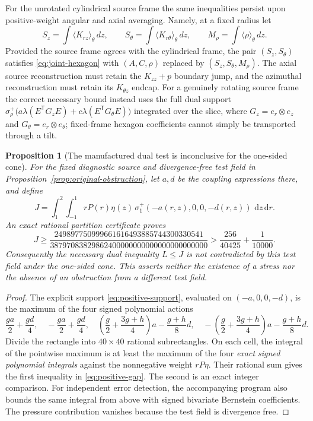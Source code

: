 \documentclass[11pt,a4paper]{article}
\theoremstyle{plain}
\newtheorem{proposition}[theorem]{Proposition}
\theoremstyle{definition}
\newcommand{\dd}{\,\mathrm{d}}
\begin{document}
For the unrotated cylindrical source frame the same inequalities
persist upon positive-weight angular and axial averaging. Namely,
at a fixed radius let
\[
 S_z=\int\!\langle K_{rz}\rangle_\theta\,dz,\qquad
 S_\theta=\int\!\langle K_{r\theta}\rangle_\theta\,dz,\qquad
 M_\rho=\int\!\langle\rho\rangle_\theta\,dz.
\]
Provided the source frame agrees with the cylindrical frame, the
pair $(S_z,S_\theta)$ satisfies \eqref{eq:joint-hexagon} with
$(A,C,\rho)$ replaced by $(S_z,S_\theta,M_\rho)$.
The axial source reconstruction must retain the $K_{zz}+p$ boundary
jump, and the azimuthal reconstruction must retain its $K_{\theta z}$
endcap. For a genuinely rotating source frame the correct necessary
bound instead uses the full dual support
$\sigma^+_\rho\bigl(a\lambda(E^{\mathsf T}G_zE)
+c\lambda(E^{\mathsf T}G_\theta E)\bigr)$ integrated over the
slice, where $G_z=e_r\otimes e_z$ and
$G_\theta=e_r\otimes e_\theta$; fixed-frame hexagon coefficients
cannot simply be transported through a tilt.

\begin{proposition}[The manufactured dual test is inconclusive for
the one-sided cone]\label{prop:positive-diagnostic}
For the fixed diagnostic source and divergence-free test field in
Proposition~\ref{prop:original-obstruction}, let $a,d$ be the
coupling expressions there, and define
\[
 J=\int_1^2\!\int_{-1}^1
 rP(r)\eta(z)\,\sigma^+_1(-a(r,z),0,0,-d(r,z))
 \,\dd z\dd r.
\]
An exact rational partition certificate proves
\begin{equation}\label{eq:positive-gap}
 J\ge\frac{249897750999661616493885744300330541}
 {38797083829862400000000000000000000000}
 >\frac{256}{40425}+\frac1{10000}.
\end{equation}
Consequently the necessary dual inequality $L\le J$ is not
contradicted by this test field under the one-sided cone. This
asserts neither the existence of a stress nor the absence of an
obstruction from a different test field.
\end{proposition}

\begin{proof}
The explicit support \eqref{eq:positive-support}, evaluated on
$(-a,0,0,-d)$, is the maximum of the four signed polynomial actions
\[
 \frac{ga}{2}+\frac{gd}{4},\quad
 -\frac{ga}{2}+\frac{gd}{4},\quad
 \left(\frac g2+\frac{3g+h}{4}\right)a-\frac{g+h}{8}d,\quad
 -\left(\frac g2+\frac{3g+h}{4}\right)a-\frac{g+h}{8}d.
\]
Divide the rectangle into $40\times40$ rational subrectangles.
On each cell, the integral of the pointwise maximum is at least
the maximum of the four \emph{exact signed polynomial integrals}
against the nonnegative weight $rP\eta$. Their rational sum gives
the first inequality in \eqref{eq:positive-gap}. The second is
an exact integer comparison. For independent error detection, the
accompanying program also bounds the same integral from above with
signed bivariate Bernstein coefficients. The pressure contribution
vanishes because the test field is divergence free.
\end{proof}
\end{document}
